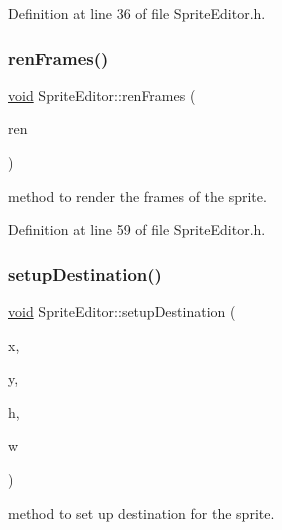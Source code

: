Definition at line 36 of file Sprite\+Editor.\+h.

\mbox{\label{class_sprite_editor_a786801f365bc4a70a11443948c27dd43}} 
\subsubsection{\texorpdfstring{renFrames()}{renFrames()}}
{\footnotesize\ttfamily \mbox{\hyperlink{_s_d_l__opengles2__gl2ext_8h_ae5d8fa23ad07c48bb609509eae494c95}{void}} Sprite\+Editor\+::ren\+Frames (\begin{DoxyParamCaption}\item[{\mbox{\hyperlink{_s_d_l__render_8h_aaf0bf7d020754fc614fe06552ea4d5d4}{S\+D\+L\+\_\+\+Renderer}} $\ast$}]{ren }\end{DoxyParamCaption})\hspace{0.3cm}{\ttfamily [inline]}}



method to render the frames of the sprite. 



Definition at line 59 of file Sprite\+Editor.\+h.

\mbox{\label{class_sprite_editor_a3a52a8f8d53121a14b0a31043a977d87}} 
\subsubsection{\texorpdfstring{setupDestination()}{setupDestination()}}
{\footnotesize\ttfamily \mbox{\hyperlink{_s_d_l__opengles2__gl2ext_8h_ae5d8fa23ad07c48bb609509eae494c95}{void}} Sprite\+Editor\+::setup\+Destination (\begin{DoxyParamCaption}\item[{int}]{x,  }\item[{int}]{y,  }\item[{int}]{h,  }\item[{int}]{w }\end{DoxyParamCaption})\hspace{0.3cm}{\ttfamily [inline]}}



method to set up destination for the sprite. 



